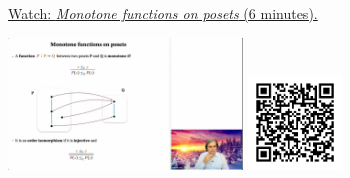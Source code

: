 
\begin{minipage}{10cm}
    \href{https://act4e-spring21.netlify.app/videos/spring2021-functors:semi-and-fun:mon-functions:mon-on-pos.html}{Watch: \emph{Monotone functions on posets} (6 minutes).}
        
    \href{https://act4e-spring21.netlify.app/videos/spring2021-functors:semi-and-fun:mon-functions:mon-on-pos.html}{\includegraphics[height=3.5cm]{spring2021-functors:semi-and-fun:mon-functions:mon-on-pos/thumbnails.jpg}}
    \href{https://act4e-spring21.netlify.app/videos/spring2021-functors:semi-and-fun:mon-functions:mon-on-pos.html}{\includegraphics[height=2.5cm]{spring2021-functors:semi-and-fun:mon-functions:mon-on-pos/qrcode.png}}
\end{minipage}
